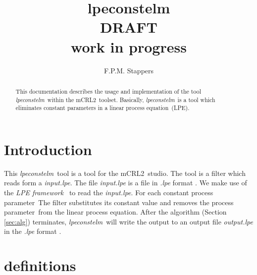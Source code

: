 \documentclass[a4paper,10pt]{article}
\title{lpeconstelm \\ DRAFT \\ work in progress}
\author{F.P.M. Stappers}
\newcommand{\lpe}{linear process equation}
\newcommand{\tool}{\textit{lpeconstelm}}
\newcommand{\mcrl}{mCRL2}
\newcommand{\framework}{\textit{LPE framework} \cite{LPEframework}}
\newcommand{\pp}{process parameter}
\newcommand{\ti}{\textit}
\begin{document}
\maketitle

\begin{abstract}
This documentation describes the usage and implementation of the tool \tool\ within the \mcrl\ toolset.
Basically, \tool\ is a tool which eliminates constant parameters in a \lpe\ (LPE).
\end{abstract}

\tableofcontents

\section{Introduction}
This \tool\ tool is a tool for the \mcrl\ studio. The tool is a
filter which reads form a \ti{input.lpe}. The file \ti{input.lpe} is
a file in \ti{.lpe} format \cite{LPEformat}. We make use of the
\framework\ to read the \ti{input.lpe}. For
each constant \pp\ The filter substitutes its constant value and removes the \pp\ from the
\lpe . After the algorithm (Section \ref{sec:alg}) terminates, \tool\
will write the output to an output file \ti{output.lpe} in the \ti{.lpe} format \cite{LPEformat}.

\section{definitions} \label{sec:def}
\end{document}
